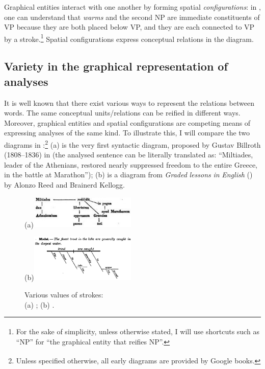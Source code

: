 \documentclass[output=paper]{langsci/langscibook}
\begin{document}
Graphical entities interact with one another by forming spatial \textit{configurations}: in , one can understand that \textit{warms} and the second NP are immediate constituents of VP because they are both placed below VP, and they are each connected to VP by a stroke.\footnote{\textrm{\textsuperscript{} }\textrm{For the sake of simplicity, unless otherwise stated, I will use shortcuts such as “NP” for “the graphical entity that reifies NP”.}} Spatial configurations express conceptual relations in the diagram.

\subsection{Variety in the graphical representation of analyses}

It is well known that there exist various ways to represent the relations between words. The same conceptual units/relations can be reified in different ways. Moreover, graphical entities and spatial configurations are competing means of expressing analyses of the same kind. To illustrate this, I will compare the two diagrams in :\footnote{\textrm{\textsuperscript{} }\textrm{Unless specified otherwise, all early diagrams are provided by Google books.}} (a) is the very first syntactic diagram, proposed by Gustav Billroth (1808–1836) in \citeyear{billroth__lateinische_1832} (the analysed sentence can be literally translated as: “Miltiades, leader of the Athenians, restored nearly suppressed freedom to the entire Greece, in the battle at Marathon”); (b) is a diagram from \textit{Graded} \textit{lessons} \textit{in} \textit{English} (\citeyear{reed_graded_1879}) by Alonzo Reed and Brainerd Kellogg.


\begin{figure}
    
    \centering
        (a)\includegraphics[width=0.45\textwidth]{figures/04/Kap.4.img.0002.jpg}
        
        (b)\includegraphics[width=0.45\textwidth]{figures/04/Kap.4.img.0002b.jpg}
        
    \caption{Various values of strokes:\\ 
    (a) \citet[102]{billroth__lateinische_1832}; (b) \citet[62]{reed_graded_1879}.}
    \label{fig:2}
    
\end{figure}
\end{document}

